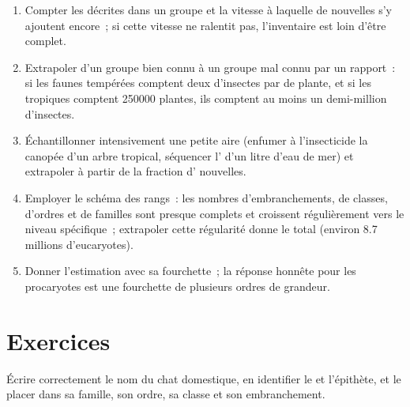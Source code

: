 \begin{method}\label{met:b1:classifying-biodiversity:estimate}
\begin{enumerate}
  \item Compter les  décrites dans un groupe et la vitesse à
        laquelle de nouvelles s'y ajoutent encore~; si cette vitesse ne
        ralentit pas, l'inventaire est loin d'être complet.
  \item Extrapoler d'un groupe bien connu à un groupe mal connu par un
        rapport~: si les faunes tempérées comptent deux 
        d'insectes par  de plante, et si les tropiques comptent
        \num{250000} plantes, ils comptent au moins un demi-million
        d'insectes.
  \item Échantillonner intensivement une petite aire (enfumer à
        l'insecticide la canopée d'un arbre tropical, séquencer l'
        d'un litre d'eau de mer) et extrapoler à partir de la fraction
        d' nouvelles.
  \item Employer le schéma des rangs~: les nombres d'embranchements, de
        classes, d'ordres et de familles sont presque complets et
        croissent régulièrement vers le niveau spécifique~;
        extrapoler cette régularité donne le total (environ \num{8.7}
        millions d'eucaryotes).
  \item Donner l'estimation avec sa fourchette~; la réponse honnête pour
        les procaryotes est une fourchette de plusieurs ordres de
        grandeur.
\end{enumerate}
\end{method}

\section{Exercices}

\begin{exercise}[$\star$]\label{exo:b1:classifying-biodiversity:1}
Écrire correctement le nom du chat domestique, en identifier le 
et l'épithète, et le placer dans sa famille, son ordre, sa classe et
son embranchement.
\end{exercise}

